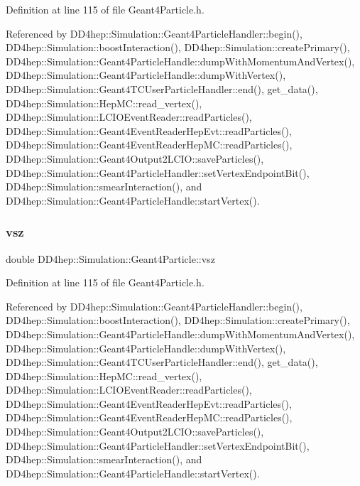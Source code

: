 Definition at line 115 of file Geant4\+Particle.\+h.



Referenced by D\+D4hep\+::\+Simulation\+::\+Geant4\+Particle\+Handler\+::begin(), D\+D4hep\+::\+Simulation\+::boost\+Interaction(), D\+D4hep\+::\+Simulation\+::create\+Primary(), D\+D4hep\+::\+Simulation\+::\+Geant4\+Particle\+Handle\+::dump\+With\+Momentum\+And\+Vertex(), D\+D4hep\+::\+Simulation\+::\+Geant4\+Particle\+Handle\+::dump\+With\+Vertex(), D\+D4hep\+::\+Simulation\+::\+Geant4\+T\+C\+User\+Particle\+Handler\+::end(), get\+\_\+data(), D\+D4hep\+::\+Simulation\+::\+Hep\+M\+C\+::read\+\_\+vertex(), D\+D4hep\+::\+Simulation\+::\+L\+C\+I\+O\+Event\+Reader\+::read\+Particles(), D\+D4hep\+::\+Simulation\+::\+Geant4\+Event\+Reader\+Hep\+Evt\+::read\+Particles(), D\+D4hep\+::\+Simulation\+::\+Geant4\+Event\+Reader\+Hep\+M\+C\+::read\+Particles(), D\+D4hep\+::\+Simulation\+::\+Geant4\+Output2\+L\+C\+I\+O\+::save\+Particles(), D\+D4hep\+::\+Simulation\+::\+Geant4\+Particle\+Handler\+::set\+Vertex\+Endpoint\+Bit(), D\+D4hep\+::\+Simulation\+::smear\+Interaction(), and D\+D4hep\+::\+Simulation\+::\+Geant4\+Particle\+Handle\+::start\+Vertex().

\hypertarget{class_d_d4hep_1_1_simulation_1_1_geant4_particle_aba9c37b5693ebe378cd17519228daa3d}{}\label{class_d_d4hep_1_1_simulation_1_1_geant4_particle_aba9c37b5693ebe378cd17519228daa3d} 
\subsubsection{\texorpdfstring{vsz}{vsz}}
{\footnotesize\ttfamily double D\+D4hep\+::\+Simulation\+::\+Geant4\+Particle\+::vsz}



Definition at line 115 of file Geant4\+Particle.\+h.



Referenced by D\+D4hep\+::\+Simulation\+::\+Geant4\+Particle\+Handler\+::begin(), D\+D4hep\+::\+Simulation\+::boost\+Interaction(), D\+D4hep\+::\+Simulation\+::create\+Primary(), D\+D4hep\+::\+Simulation\+::\+Geant4\+Particle\+Handle\+::dump\+With\+Momentum\+And\+Vertex(), D\+D4hep\+::\+Simulation\+::\+Geant4\+Particle\+Handle\+::dump\+With\+Vertex(), D\+D4hep\+::\+Simulation\+::\+Geant4\+T\+C\+User\+Particle\+Handler\+::end(), get\+\_\+data(), D\+D4hep\+::\+Simulation\+::\+Hep\+M\+C\+::read\+\_\+vertex(), D\+D4hep\+::\+Simulation\+::\+L\+C\+I\+O\+Event\+Reader\+::read\+Particles(), D\+D4hep\+::\+Simulation\+::\+Geant4\+Event\+Reader\+Hep\+Evt\+::read\+Particles(), D\+D4hep\+::\+Simulation\+::\+Geant4\+Event\+Reader\+Hep\+M\+C\+::read\+Particles(), D\+D4hep\+::\+Simulation\+::\+Geant4\+Output2\+L\+C\+I\+O\+::save\+Particles(), D\+D4hep\+::\+Simulation\+::\+Geant4\+Particle\+Handler\+::set\+Vertex\+Endpoint\+Bit(), D\+D4hep\+::\+Simulation\+::smear\+Interaction(), and D\+D4hep\+::\+Simulation\+::\+Geant4\+Particle\+Handle\+::start\+Vertex().



